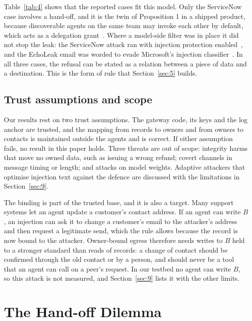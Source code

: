 \documentclass[conference,compsoc]{IEEEtran}
\begin{document}
Table~\ref{tab:4} shows that the reported cases fit this model. Only the ServiceNow case involves a hand-off, and it is the twin of Proposition 1 in a shipped product, because discoverable agents on the same team may invoke each other by default, which acts as a delegation grant~\cite{costello2025appomni}. Where a model-side filter was in place it did not stop the leak: the ServiceNow attack ran with injection protection enabled~\cite{costello2025appomni}, and the EchoLeak email was worded to evade Microsoft's injection classifier~\cite{reddy2025echoleak}. In all three cases, the refusal can be stated as a relation between a piece of data and a destination. This is the form of rule that Section~\ref{sec:5} builds.

\subsection{Trust assumptions and scope}\label{sec:3.3}

Our results rest on two trust assumptions. The gateway code, its keys and the log anchor are trusted, and the mapping from records to owners and from owners to contacts is maintained outside the agents and is correct. If either assumption fails, no result in this paper holds. Three threats are out of scope: integrity harms that move no owned data, such as issuing a wrong refund; covert channels in message timing or length; and attacks on model weights. Adaptive attackers that optimise injection text against the defence are discussed with the limitations in Section~\ref{sec:9}.

The binding is part of the trusted base, and it is also a target. Many support systems let an agent update a customer's contact address. If an agent can write $B$, an injection can ask it to change a customer's email to the attacker's address and then request a legitimate send, which the rule allows because the record is now bound to the attacker. Owner-bound egress therefore needs writes to $B$ held to a stronger standard than reads of records: a change of contact should be confirmed through the old contact or by a person, and should never be a tool that an agent can call on a peer's request. In our testbed no agent can write $B$, so this attack is not measured, and Section~\ref{sec:9} lists it with the other limits.

\section{The Hand-off Dilemma}\label{sec:4}
\end{document}
